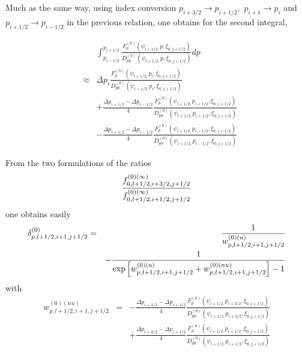 Much as the same way, using index conversion $p_{i+3/2}\rightarrow
p_{i+1/2}, $ $p_{i+1}\rightarrow p_{i}$ and $p_{i+1/2}\rightarrow p_{i-1/2}$
in the previous relation, one obtains for the second integral,

\begin{eqnarray}
&&\int_{p_{i-1/2}}^{p_{i+1/2}}\frac{F_{p}^{\left( 0\right) }\left( \psi
_{l+1/2,}p,\xi _{0,j+1/2}\right) }{D_{pp}^{\left( 0\right) }\left( \psi
_{l+1/2,}p,\xi _{0,j+1/2}\right) }dp  \nonumber \\
&\approx &\Delta p_{i}\frac{F_{p}^{\left( 0\right) }\left( \psi
_{l+1/2,}p_{i},\xi _{0,j+1/2}\right) }{D_{pp}^{\left( 0\right) }\left( \psi
_{l+1/2,}p_{i},\xi _{0,j+1/2}\right) }  \nonumber \\
&&+\frac{\Delta p_{i+1/2}-\Delta p_{i-1/2}}{4}\frac{F_{p}^{\left( 0\right)
}\left( \psi _{l+1/2,}p_{i+1/2},\xi _{0,j+1/2}\right) }{D_{pp}^{\left(
0\right) }\left( \psi _{l+1/2,}p_{i+1/2},\xi _{0,j+1/2}\right) }  \nonumber
\\
&&-\frac{\Delta p_{i+1/2}-\Delta p_{i-1/2}}{4}\frac{F_{p}^{\left( 0\right)
}\left( \psi _{l+1/2,}p_{i-1/2},\xi _{0,j+1/2}\right) }{D_{pp}^{\left(
0\right) }\left( \psi _{l+1/2,}p_{i-1/2},\xi _{0,j+1/2}\right) }
\end{eqnarray}

From the two formulations of the ratios
\begin{equation}
\frac{f_{0,l+1/2,i+3/2,j+1/2}^{\left( 0\right) (\infty )}}{%
f_{0,l+1/2,i+1/2,j+1/2}^{\left( 0\right) (\infty )}}
\end{equation}
one obtains easily
\begin{eqnarray}
\delta _{p,l+1/2,i+1,j+1/2}^{\left( 0\right) } &=&\frac{1}{%
w_{p,l+1/2,i+1,j+1/2}^{\left( 0\right) (u)}}  \nonumber \\
&&-\frac{1}{\exp \left[ w_{p,l+1/2,i+1,j+1/2}^{\left( 0\right)
(u)}+w_{p,l+1/2,i+1,j+1/2}^{\left( 0\right) (nu)}\right] -1}
\end{eqnarray}
with
\begin{eqnarray}
w_{p,l+1/2,i+1,j+1/2}^{\left( 0\right) (nu)} &=&-\frac{\Delta
p_{i+3/2}-\Delta p_{i+1/2}}{4}\frac{F_{p}^{\left( 0\right) }\left( \psi
_{l+1/2,}p_{i+3/2},\xi _{0,j+1/2}\right) }{D_{pp}^{\left( 0\right) }\left(
\psi _{l+1/2,}p_{i+3/2},\xi _{0,j+1/2}\right) }  \nonumber \\
&&+\frac{\Delta p_{i+3/2}-\Delta p_{i+1/2}}{4}\frac{F_{p}^{\left( 0\right)
}\left( \psi _{l+1/2,}p_{i+1/2},\xi _{0,j+1/2}\right) }{D_{pp}^{\left(
0\right) }\left( \psi _{l+1/2,}p_{i+1/2},\xi _{0,j+1/2}\right) }
\end{eqnarray}

